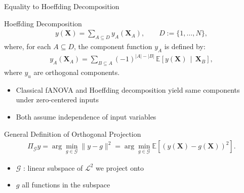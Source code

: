 \begin{frame}{Equality to Hoeffding Decomposition} %
  \begin{block}{Hoeffding Decomposition}
    \begin{align}
    y(\boldsymbol{X})
=
\sum_{A \subseteq D} 
y_A(\boldsymbol{X}_A),
\qquad
D := \{1,\dots,N\},
\end{align}
where, for each $A \subseteq D$, the component function $y_A$ is defined by:
\begin{align}\label{eq:hoeffding_components}
    y_A(\boldsymbol{X}_A)
=
\sum_{B \subseteq A}
(-1)^{|A|-|B|}
\,\mathbb{E}\!\left[
  y(\boldsymbol{X}) 
  \,\middle|\, 
  \boldsymbol{X}_B
\right],
\end{align}
  where $y_u$ are orthogonal components.
  \end{block}
  \begin{itemize}
    \item Classical fANOVA and Hoeffding decomposition yield same components under zero-centered inputs
    \item Both assume independence of input variables
  \end{itemize}
  
\end{frame}



\begin{frame}{General Definition of Orthogonal Projection} %
  \begin{align}
    \Pi_{\mathcal{G}}y = \arg\min_{g \in \mathcal{G}} \|y - g\|^2
= \arg\min_{g \in \mathcal{G}} \mathbb{E}[(y(\boldsymbol{X}) - g(\boldsymbol{X}))^2].
\end{align}
  \begin{itemize}
    \item $\mathcal{G}$ : linear subspace of $\mathcal{L}^2$ we project onto
    \item $g$ all functions in the subspace
  \end{itemize}
\end{frame}

